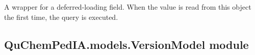 \documentclass[letterpaper,10pt,english]{sphinxmanual}
\begin{document}
\begin{fulllineitems}
\begin{fulllineitems}
\end{fulllineitems}


\begin{fulllineitems}
\label{\detokenize{QuChemPedIA.models:QuChemPedIA.models.UserModel.Utilisateur.staff}}
A wrapper for a deferred-loading field. When the value is read from this
object the first time, the query is executed.

\end{fulllineitems}


\end{fulllineitems}



\subsection{QuChemPedIA.models.VersionModel module}
\label{\detokenize{QuChemPedIA.models:module-QuChemPedIA.models.VersionModel}}\label{\detokenize{QuChemPedIA.models:quchempedia-models-versionmodel-module}}
\end{document}
